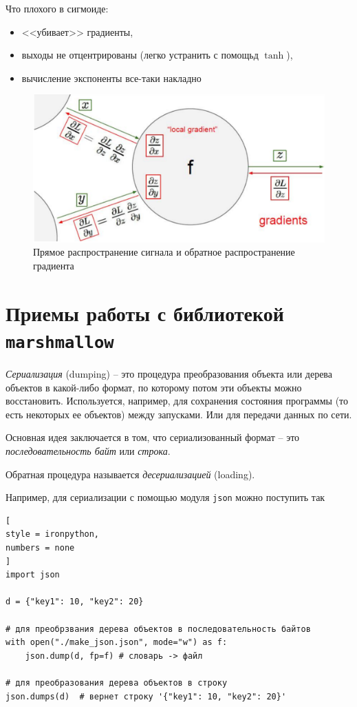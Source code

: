 \documentclass[%
	11pt,
	a4paper,
	utf8,
		]{article}
\begin{document}
Что плохого в сигмоиде:
\begin{itemize}
	\item <<убивает>> градиенты,
	
	\item выходы не отцентрированы (легко устранить с помощьд $ \tanh $),
	
	\item вычисление экспоненты все-таки накладно
\end{itemize}


\begin{figure}[h]
	\centering
	\includegraphics[scale=0.5]{figures/backprop.png}
	\caption{ Прямое распространение сигнала и обратное распространение градиента }\label{fig:backprop}
\end{figure}

\section{Приемы работы с библиотекой \texttt{marshmallow}}

\emph{Сериализация} ({dumping}) -- это процедура преобразования объекта или дерева объектов в какой-либо формат, по которому потом эти объекты можно восстановить. Используется, например, для сохранения состояния программы (то есть некоторых ее объектов) между запусками. Или для передачи данных по сети. 

Основная идея заключается в том, что сериализованный формат -- это \emph{последовательность байт} или \emph{строка}.

Обратная процедура называется \emph{десериализацией} (loading).

Например, для сериализации с помощью модуля \texttt{json} можно поступить так
\begin{lstlisting}[
style = ironpython,
numbers = none
]
import json

d = {"key1": 10, "key2": 20}

# для преобрзвания дерева объектов в последовательность байтов
with open("./make_json.json", mode="w") as f:
    json.dump(d, fp=f) # словарь -> файл

# для преобразования дерева объектов в строку
json.dumps(d)  # вернет строку '{"key1": 10, "key2": 20}'
\end{lstlisting}
\end{document}

